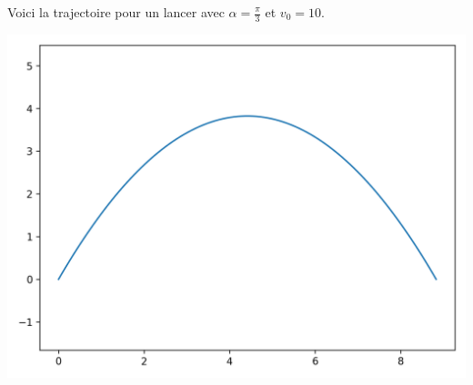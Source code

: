 \documentclass[11pt,class=report,crop=false]{standalone}
\begin{document}
Voici la trajectoire pour un lancer avec $\alpha = \frac\pi3$ et $v_0 = 10$.
\begin{center}
    \includegraphics[scale=\myscale,scale=0.5]{figures/balle1}
\end{center}
\end{document}

